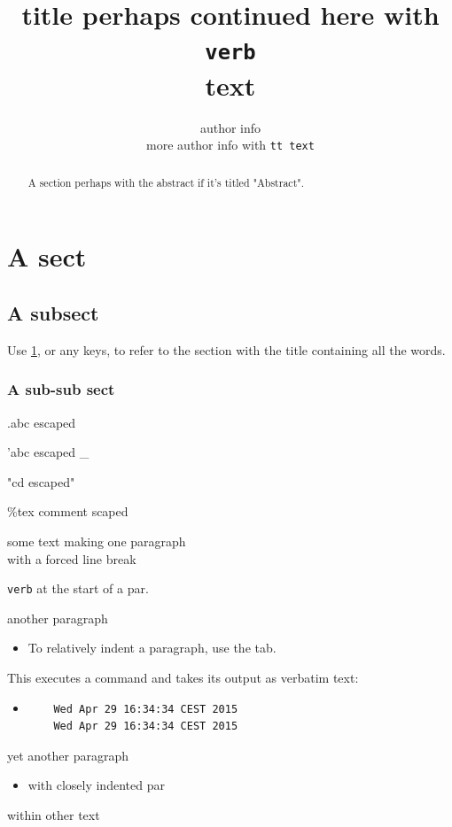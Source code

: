 \documentclass[a4paper]{article}
\title{title perhaps continued here with \texttt{verb \\} text}
\author{author info\\
more author info with \texttt{tt text}}
\begin{document}
\maketitle{}
\begin{abstract}
A section perhaps with the abstract if it's titled "Abstract".

\end{abstract}
\section{A sect}
\label{sec1}
\subsection{A subsect}
\label{sec1x1}
Use \ref{sec1}, or any keys, to refer to the section with the title
containing all the words.

\subsubsection{A sub-sub sect}
\label{sec1x1x1}
.abc escaped

'abc escaped \_

"cd escaped"

\%tex comment scaped

some text making one paragraph\\
with a forced line break

\texttt{verb} at the start of a par.

another paragraph

\begin{itemize}
\item[]
    To relatively indent a paragraph, use the tab.

\end{itemize}
This executes a command and takes its output as verbatim text:
\begin{itemize}
\item[]
    \begin{verbatim}
    Wed Apr 29 16:34:34 CEST 2015
    Wed Apr 29 16:34:34 CEST 2015
    \end{verbatim}

\end{itemize}
yet another paragraph
\begin{itemize}
\item[]
    with closely indented par
\end{itemize}
within other text
\end{document}

